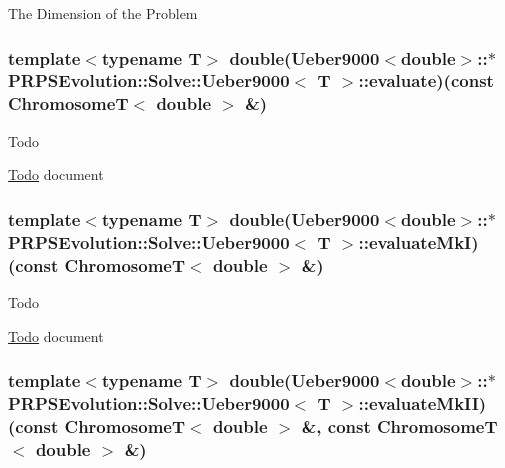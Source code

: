 \-The \-Dimension of the \-Problem \hypertarget{struct_p_r_p_s_evolution_1_1_solve_1_1_ueber9000_acc89aa4176099e0fe3633f396426d06b}{
\subsubsection[{evaluate}]{\setlength{\rightskip}{0pt plus 5cm}template$<$typename \-T$>$ double({\bf \-Ueber9000}$<$double$>$\-::$\ast$ {\bf \-P\-R\-P\-S\-Evolution\-::\-Solve\-::\-Ueber9000}$<$ \-T $>$\-::{\bf evaluate})(const \-Chromosome\-T$<$ double $>$ \&)}}\label{struct_p_r_p_s_evolution_1_1_solve_1_1_ueber9000_acc89aa4176099e0fe3633f396426d06b}
\begin{DoxyRefDesc}{\-Todo}
\item[\hyperlink{todo__todo000007}{\-Todo}]document \end{DoxyRefDesc}
\hypertarget{struct_p_r_p_s_evolution_1_1_solve_1_1_ueber9000_a0468bd48bc15e692e299435b0a2ecc9a}{
\subsubsection[{evaluate\-Mk\-I}]{\setlength{\rightskip}{0pt plus 5cm}template$<$typename \-T$>$ double({\bf \-Ueber9000}$<$double$>$\-::$\ast$ {\bf \-P\-R\-P\-S\-Evolution\-::\-Solve\-::\-Ueber9000}$<$ \-T $>$\-::{\bf evaluate\-Mk\-I})(const \-Chromosome\-T$<$ double $>$ \&)}}\label{struct_p_r_p_s_evolution_1_1_solve_1_1_ueber9000_a0468bd48bc15e692e299435b0a2ecc9a}
\begin{DoxyRefDesc}{\-Todo}
\item[\hyperlink{todo__todo000008}{\-Todo}]document \end{DoxyRefDesc}
\hypertarget{struct_p_r_p_s_evolution_1_1_solve_1_1_ueber9000_aeb891e166bc342c173302b523e7b03dd}{
\subsubsection[{evaluate\-Mk\-I\-I}]{\setlength{\rightskip}{0pt plus 5cm}template$<$typename \-T$>$ double({\bf \-Ueber9000}$<$double$>$\-::$\ast$ {\bf \-P\-R\-P\-S\-Evolution\-::\-Solve\-::\-Ueber9000}$<$ \-T $>$\-::{\bf evaluate\-Mk\-I\-I})(const \-Chromosome\-T$<$ double $>$ \&, const \-Chromosome\-T$<$ double $>$ \&)}}\label{struct_p_r_p_s_evolution_1_1_solve_1_1_ueber9000_aeb891e166bc342c173302b523e7b03dd}
